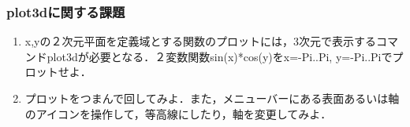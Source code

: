 \subsubsection{plot3dに関する課題}
\begin{enumerate} 
\item x,yの２次元平面を定義域とする関数のプロットには，3次元で表示するコマンドplot3dが必要となる．２変数関数sin(x)*cos(y)をx=-Pi..Pi,
y=-Pi..Piでプロットせよ．
\item プロットをつまんで回してみよ．また，メニューバーにある表面あるいは軸のアイコンを操作して，等高線にしたり，軸を変更してみよ．
\end{enumerate}
